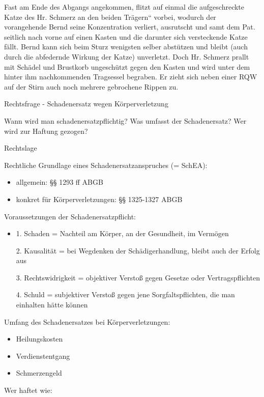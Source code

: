 \documentclass{article}
\begin{document}
Fast am Ende des Abgangs angekommen, flitzt auf einmal die
aufgeschreckte Katze des Hr. Schmerz an den beiden
{\quotedblbase}Tr\"agern{\textquotedblleft} vorbei, wodurch der
vorangehende Bernd seine Konzentration verliert, ausrutscht und samt
dem Pat. seitlich nach vorne auf einen Kasten und die darunter sich
versteckende Katze f\"allt. Bernd kann sich beim Sturz wenigsten selber
abst\"utzen und bleibt (auch durch die abfedernde Wirkung der Katze)
unverletzt. Doch Hr. Schmerz prallt mit Sch\"adel und Brustkorb
ungesch\"utzt gegen den Kasten und wird unter dem hinter ihm
nachkommenden Tragsessel begraben. Er zieht sich neben einer RQW auf
der Stirn auch noch mehrere gebrochene Rippen zu. 

Rechtsfrage - Schadenersatz wegen K\"orperverletzung

Wann wird man schadenersatzpflichtig? Was umfasst der Schadenersatz? Wer
wird zur Haftung gezogen?

Rechtslage

Rechtliche Grundlage eines Schadenersatzanspruches (= SchEA):

\begin{itemize}
\item allgemein: {\S}{\S} 1293 ff ABGB

\item konkret f\"ur K\"orperverletzungen: {\S}{\S} 1325-1327 ABGB

\end{itemize}
Voraussetzungen der Schadenersatzpflicht:

\begin{itemize}
\item[] 1. Schaden = Nachteil am K\"orper, an der Gesundheit, im
Verm\"ogen

2. Kausalit\"at = bei Wegdenken der Sch\"adigerhandlung, bleibt auch der
Erfolg aus

3. Rechtswidrigkeit = objektiver Versto{\ss} gegen Gesetze oder
Vertragspflichten

4. Schuld = subjektiver Versto{\ss} gegen jene Sorgfaltspflichten, die
man einhalten h\"atte k\"onnen

\end{itemize}
Umfang des Schadenersatzes bei K\"orperverletzungen:

\begin{itemize}
\item Heilungskosten

\item Verdienstentgang

\item Schmerzengeld

\end{itemize}
Wer haftet wie:
\end{document}
